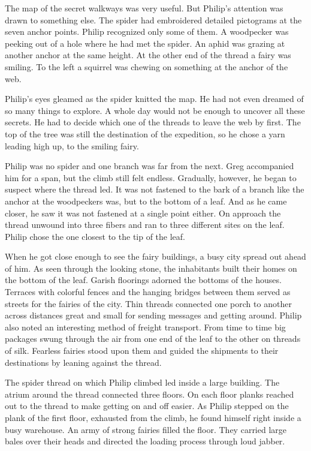 \documentclass[10pt]{memoir}
\begin{document}
The map of the secret walkways was very useful. But Philip's attention was
drawn to something else. The spider had embroidered detailed pictograms at the
seven anchor points. Philip recognized only some of them. A woodpecker was
peeking out of a hole where he had met the spider. An aphid was grazing at
another anchor at the same height. At the other end of the thread a fairy was
smiling. To the left a squirrel was chewing on something at the anchor of the
web.

Philip's eyes gleamed as the spider knitted the map. He had not even dreamed of
so many things to explore. A whole day would not be enough to uncover all these
secrets. He had to decide which one of the threads to leave the web by first.
The top of the tree was still the destination of the expedition, so he chose a
yarn leading high up, to the smiling fairy.

Philip was no spider and one branch was far from the next. Greg accompanied him
for a span, but the climb still felt endless. Gradually, however, he began to
suspect where the thread led. It was not fastened to the bark of a branch like
the anchor at the woodpeckers was, but to the bottom of a leaf. And as he came
closer, he saw it was not fastened at a single point either. On approach the
thread unwound into three fibers and ran to three different sites on the leaf.
Philip chose the one closest to the tip of the leaf.

When he got close enough to see the fairy buildings, a busy city spread out
ahead of him. As seen through the looking stone, the inhabitants built their
homes on the bottom of the leaf. Garish floorings adorned the bottoms of the
houses. Terraces with colorful fences and the hanging bridges between them
served as streets for the fairies of the city. Thin threads connected one porch
to another across distances great and small for sending messages and getting
around. Philip also noted an interesting method of freight transport. From time
to time big packages swung through the air from one end of the leaf to the
other on threads of silk. Fearless fairies stood upon them and guided the
shipments to their destinations by leaning against the thread.

The spider thread on which Philip climbed led inside a large building. The
atrium around the thread connected three floors. On each floor planks reached
out to the thread to make getting on and off easier. As Philip stepped on the
plank of the first floor, exhausted from the climb, he found himself right
inside a busy warehouse. An army of strong fairies filled the floor. They
carried large bales over their heads and directed the loading process through
loud jabber.
\end{document}

